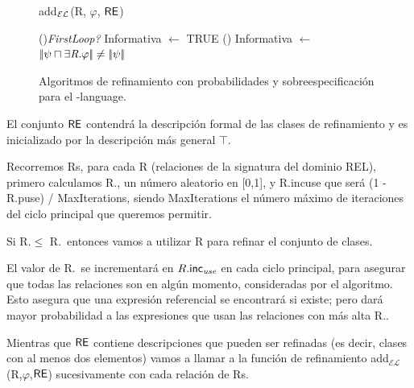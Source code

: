 \begin{figure}[!t]
\begin{algorithm}[H]
\dontprintsemicolon
\caption{add$_\mathcal{EL}$(R, $\varphi$, $\textsf{RE}$)} \label{algo:bisim-add-el-over}

\If(){\em FirstLoop?}{
    Informativa $\leftarrow$ TRUE }
\lElse() {Informativa $\leftarrow$ $|\!|\psi \sqcap \exists \mbox{\em R}.\varphi|\!| \neq |\!|\psi|\!|$} 
\end{algorithm}
\vspace*{-.5cm}\caption{Algoritmos de refinamiento con probabilidades y sobreespecificaci\'on para el \el-language.}\label{fig:algo3}

\end{figure}

El conjunto $\textsf{RE}$ contendr\'a la descripci\'on formal de las clases de refinamiento
y es inicializado por la descripci\'on m\'as general $\top$.

Recorremos Rs, para cada R (relaciones de la signatura del dominio REL), primero calculamos R.\randomuse, un n\'umero aleatorio en [0,1], y R.incuse que ser\'a (1 -R.puse) / MaxIterations, siendo MaxIterations el n\'umero m\'aximo de iteraciones del ciclo principal que queremos permitir.

Si R.\randomuse $\le$ R.\puse\ entonces vamos a utilizar R para refinar el conjunto de
clases. 

El valor de R.\puse\ se incrementar\'a en $R.\textsf{inc}_\emph{use}$
en cada ciclo principal, para asegurar que todas las relaciones son en alg\'un momento,
consideradas por el algoritmo. Esto asegura que una expresi\'on referencial
se encontrar\'a si existe; pero dar\'a mayor probabilidad a las expresiones
que usan las relaciones con m\'as alta R.\puse.
 
Mientras que $\textsf{RE}$ contiene descripciones que pueden ser refinadas (es decir, clases
con al menos dos elementos) vamos a llamar a la funci\'on de refinamiento
add$_\mathcal{EL}$(R,$\varphi$,$\textsf{RE}$) sucesivamente con cada relaci\'on
de Rs.

